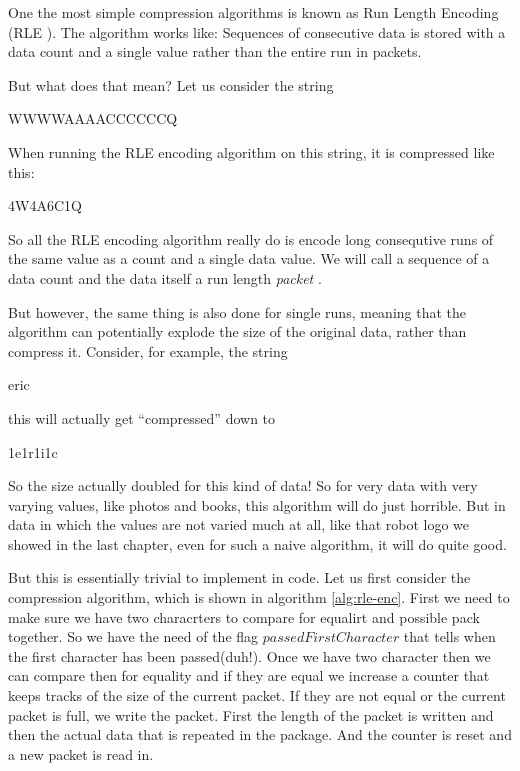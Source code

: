\begin{refsection}
One the most simple compression algorithms is known as Run Length
Encoding (RLE
). \cite{nagarajan11:_enhan_approac_run_lengt_encod_schem}
The algorithm works like: Sequences of consecutive
data is stored with a data count and a single value rather than the entire
run in packets.

But what does that mean? Let us consider the string

\begin{indentpar}
  WWWWAAAACCCCCCQ
\end{indentpar}

When running the RLE encoding algorithm on this string, it is
compressed like this:

\begin{indentpar}
  4W4A6C1Q
\end{indentpar}

So all the RLE encoding algorithm really do is encode long consequtive
runs of the same value as a count and a single data value. We will call a
sequence of a data count and the data itself a run length
\textit{packet} .

But however, the same thing is also done for single runs, meaning that
the algorithm can potentially explode the size of the original data,
rather than compress it. Consider, for example, the string

\begin{indentpar}
  eric
\end{indentpar}

this will actually get ``compressed'' down to

\begin{indentpar}
  1e1r1i1c
\end{indentpar}

So the size actually doubled for this kind of data! So for very data
with very varying values, like photos and books, this algorithm will
do just horrible. But in data in which the values are not varied much
at all, like that robot logo we showed in the last chapter, even for such a
naive algorithm, it will do quite good.

But this is essentially trivial to implement in code. Let us first
consider the compression algorithm, which is shown in algorithm
\ref{alg:rle-enc}. First we need to make sure we have two characrters
to compare for equalirt and possible pack together. So we have the
need of the flag $passedFirstCharacter$ that tells when the first
character has been passed(duh!). Once we have two character then we
can compare then for equality and if they are equal we increase a
counter that keeps tracks of the size of the current packet. If they
are not equal or the current packet is full, we write the
packet. First the length of the packet is written and then the actual
data that is repeated in the package. And the counter is reset and a
new packet is read in.


\end{refsection}

